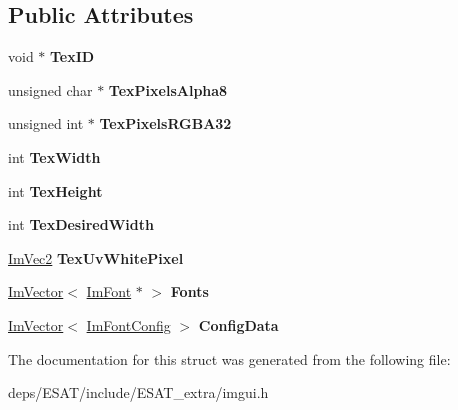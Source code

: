 \subsection*{Public Attributes}
\begin{DoxyCompactItemize}
\item 
\mbox{\label{struct_im_font_atlas_a4a6b3fa709b3bf0817eb9725b806446f}} 
void $\ast$ {\bfseries Tex\+ID}
\item 
\mbox{\label{struct_im_font_atlas_a443ea9e7c4cf85ee791ffe891280eff3}} 
unsigned char $\ast$ {\bfseries Tex\+Pixels\+Alpha8}
\item 
\mbox{\label{struct_im_font_atlas_a41163489a5b8060f405c56e22590cba5}} 
unsigned int $\ast$ {\bfseries Tex\+Pixels\+R\+G\+B\+A32}
\item 
\mbox{\label{struct_im_font_atlas_a2d0662502433e7a87b3aa4681ba17aa3}} 
int {\bfseries Tex\+Width}
\item 
\mbox{\label{struct_im_font_atlas_a5ef74d37ec01d9e8aac5c57433296ce3}} 
int {\bfseries Tex\+Height}
\item 
\mbox{\label{struct_im_font_atlas_aa1d62d7da5633f894dbe881547e9de7c}} 
int {\bfseries Tex\+Desired\+Width}
\item 
\mbox{\label{struct_im_font_atlas_af1d05221e9a1607d7f625df92a4f9b7e}} 
\mbox{\hyperlink{struct_im_vec2}{Im\+Vec2}} {\bfseries Tex\+Uv\+White\+Pixel}
\item 
\mbox{\label{struct_im_font_atlas_a0198aeb17ef8bb810ccc8db103b93b1f}} 
\mbox{\hyperlink{class_im_vector}{Im\+Vector}}$<$ \mbox{\hyperlink{struct_im_font}{Im\+Font}} $\ast$ $>$ {\bfseries Fonts}
\item 
\mbox{\label{struct_im_font_atlas_afa4f7459807763d032fe2d0022fc0823}} 
\mbox{\hyperlink{class_im_vector}{Im\+Vector}}$<$ \mbox{\hyperlink{struct_im_font_config}{Im\+Font\+Config}} $>$ {\bfseries Config\+Data}
\end{DoxyCompactItemize}


The documentation for this struct was generated from the following file\+:\begin{DoxyCompactItemize}
\item 
deps/\+E\+S\+A\+T/include/\+E\+S\+A\+T\+\_\+extra/imgui.\+h\end{DoxyCompactItemize}
